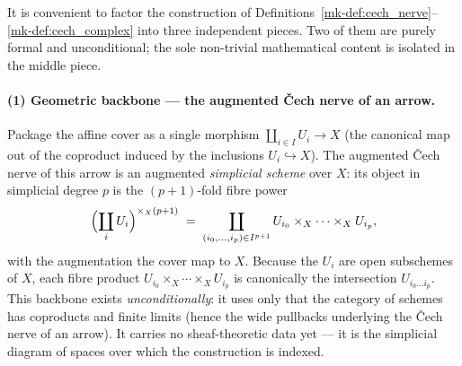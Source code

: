 It is convenient to factor the construction of
Definitions~\ref{mk-def:cech_nerve}--\ref{mk-def:cech_complex} into three independent
pieces. Two of them are purely formal and unconditional; the sole non-trivial
mathematical content is isolated in the middle piece.

\paragraph{(1) Geometric backbone — the augmented {\v C}ech nerve of an arrow.}
Package the affine cover as a single morphism
\(\coprod_{i \in I} U_i \longrightarrow X\) (the canonical map out of the
coproduct induced by the inclusions \(U_i \hookrightarrow X\)). The augmented
{\v C}ech nerve of this arrow is an augmented \emph{simplicial scheme} over
\(X\): its object in simplicial degree \(p\) is the \((p+1)\)-fold fibre power
\[
  \Bigl(\coprod_{i} U_i\Bigr)^{\times_X (p+1)}
    \;=\;
    \coprod_{(i_0, \ldots, i_p) \in I^{p+1}}
      U_{i_0} \times_X \cdots \times_X U_{i_p},
\]
with the augmentation the cover map to \(X\). Because the \(U_i\) are open
subschemes of \(X\), each fibre product \(U_{i_0} \times_X \cdots \times_X U_{i_p}\)
is canonically the intersection \(U_{i_0 \ldots i_p}\). This backbone exists
\emph{unconditionally}: it uses only that the category of schemes has coproducts
and finite limits (hence the wide pullbacks underlying the {\v C}ech nerve of an
arrow). It carries no sheaf-theoretic data yet — it is the simplicial diagram of
spaces over which the construction is indexed.

